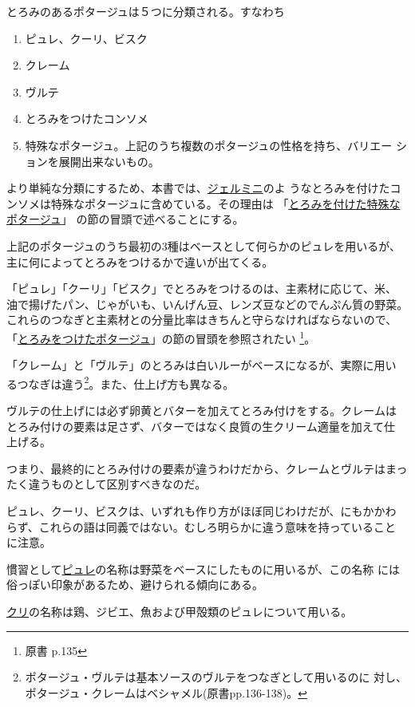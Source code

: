 
とろみのあるポタージュは５つに分類される。すなわち

\begin{enumerate}
\def\labelenumi{\arabic{enumi}.}
\item
  ピュレ、クーリ、ビスク
\item
  クレーム
\item
  ヴルテ
\item
  とろみをつけたコンソメ
\item
  特殊なポタージュ。上記のうち複数のポタージュの性格を持ち、バリエー
  ションを展開出来ないもの。
\end{enumerate}

より単純な分類にするため、本書では、\protect\hyperlink{potage-germiny}{ジェルミニ}のよ
うなとろみを付けたコンソメは特殊なポタージュに含めている。その理由は
「\protect\hyperlink{series-de-potages-lie-speciaux}{とろみを付けた特殊なポタージュ}」
の節の冒頭で述べることにする。

上記のポタージュのうち最初の3種はベースとして何らかのピュレを用いるが、
主に何によってとろみをつけるかで違いが出てくる。

「ピュレ」「クーリ」「ビスク」でとろみをつけるのは、主素材に応じて、米、
油で揚げたパン、じゃがいも、いんげん豆、レンズ豆などのでんぷん質の野菜。
これらのつなぎと主素材との分量比率はきちんと守らなければならないので、
「\protect\hyperlink{potages-lies}{とろみをつけたポタージュ}」の節の冒頭を参照されたい
\footnote{原書 p.135}。

「クレーム」と「ヴルテ」のとろみは白いルーがベースになるが、実際に用い
るつなぎは違う\footnote{ポタージュ・ヴルテは基本ソースのヴルテをつなぎとして用いるのに
  対し、ポタージュ・クレームはベシャメル(原書pp.136-138)。}。また、仕上げ方も異なる。

ヴルテの仕上げには必ず卵黄とバターを加えてとろみ付けをする。クレームは
とろみ付けの要素は足さず、バターではなく良質の生クリーム適量を加えて仕
上げる。

つまり、最終的にとろみ付けの要素が違うわけだから、クレームとヴルテはまっ
たく違うものとして区別すべきなのだ。

ピュレ、クーリ、ビスクは、いずれも作り方がほぼ同じわけだが、にもかかわ
らず、これらの語は同義ではない。むしろ明らかに違う意味を持っていること
に注意。

慣習として\ul{ピュレ}の名称は野菜をベースにしたものに用いるが、この名称
には俗っぽい印象があるため、避けられる傾向にある。

\ul{クリ}の名称は鶏、ジビエ、魚および甲殻類のピュレについて用いる。

